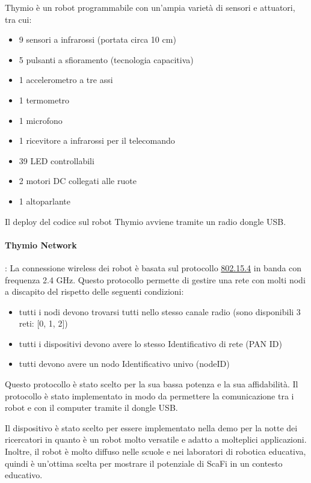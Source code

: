 \documentclass[12pt,a4paper,openright,twoside]{book}
\begin{document}
Thymio è un robot programmabile con un'ampia varietà di sensori e attuatori, tra cui:
\begin{itemize}
    \item 9 sensori a infrarossi (portata circa 10 cm)
    \item 5 pulsanti a sfioramento (tecnologia capacitiva)
    \item 1 accelerometro a tre assi
    \item 1 termometro
    \item 1 microfono
    \item 1 ricevitore a infrarossi per il telecomando
    \item 39 LED controllabili
    \item 2 motori DC collegati alle ruote
    \item 1 altoparlante
\end{itemize}

Il deploy del codice sul robot Thymio avviene tramite un radio dongle USB.
\paragraph{Thymio Network}: La connessione wireless dei robot è basata sul protocollo \href{https://en.wikipedia.org/wiki/IEEE_802.15.4}{802.15.4} in banda con frequenza 2.4 GHz. Questo protocollo permette di gestire una rete con molti nodi a discapito del rispetto delle seguenti condizioni:

\begin{itemize}
    \item tutti i nodi devono trovarsi tutti nello stesso canale radio (sono disponibili 3 reti: [0, 1, 2])
    \item tutti i dispositivi devono avere lo stesso Identificativo di rete (PAN ID)
    \item tutti devono avere un nodo Identificativo univo (nodeID)
\end{itemize}

Questo protocollo è stato scelto per la sua bassa potenza e la sua affidabilità. Il protocollo è stato implementato in modo da permettere la comunicazione tra i robot e con il computer tramite il dongle USB.

Il dispositivo è stato scelto per essere implementato nella demo per la notte dei ricercatori in quanto è un robot molto versatile e adatto a molteplici applicazioni. Inoltre, il robot è molto diffuso nelle scuole e nei laboratori di robotica educativa, quindi è un'ottima scelta per mostrare il potenziale di ScaFi in un contesto educativo.
\end{document}

